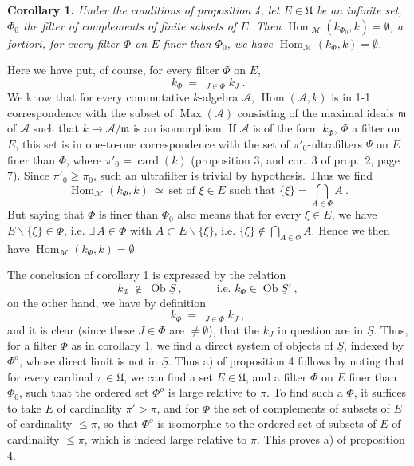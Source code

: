 \documentclass[11pt]{article}
\newcommand{\printedpage}[1]{\marginpar{\footnotesize p.~#1}}
\newcommand{\msp}[1]{\marginpar{\footnotesize [#1]}}
\newcommand{\limind}{\mathop{\underrightarrow{\mathrm{lim}}}}
\begin{document}
\textbf{Corollary 1.} \textit{Under the conditions of proposition 4, let $E\in\mathfrak{U}$ be an infinite set, $\Phi_0$ the filter of complements of finite subsets of $E$. Then $\operatorname{Hom}_{\mathcal{M}}(k_{\Phi_0},k)=\emptyset$, a fortiori, for every filter $\Phi$ on $E$ finer than $\Phi_0$, we have $\operatorname{Hom}_{\mathcal{M}}(k_\Phi,k)=\emptyset$.}

\msp{page 15}
Here we have put, of course, for every filter $\Phi$ on $E$,
\[
k_\Phi\ =\ \limind_{J\in\Phi}k_J\ .
\]
We know that for every commutative $k$-algebra $\mathcal{A}$, $\operatorname{Hom}(\mathcal{A},k)$ is in 1-1 correspondence with the subset of $\operatorname{Max}(\mathcal{A})$ consisting of the maximal ideals $\mathfrak{m}$ of $\mathcal{A}$ such that $k\longrightarrow\mathcal{A}/\mathfrak{m}$ is an isomorphism. If $\mathcal{A}$ is of the form $k_\Phi$, $\Phi$ a filter on $E$, this set is in one-to-one correspondence with the set of $\pi'_0$-ultrafilters $\Psi$ on $E$ finer than $\Phi$, where $\pi'_0=\operatorname{card}(k)$ (proposition 3, and cor.~3 of prop.~2, page 7). Since $\pi'_0\geqslant\pi_0$, such an ultrafilter is trivial by hypothesis. Thus we find
\[
\operatorname{Hom}_{\mathcal{M}}(k_\Phi,k)\ \simeq\ \text{set of } \xi\in E \text{ such that } \{\xi\}=\textstyle\bigcap_{A\in\Phi}A\ . \tag*{$(*)$}
\]
But saying that $\Phi$ is finer than $\Phi_0$ also means that for every $\xi\in E$, we have $E\backslash\{\xi\}\in\Phi$, i.e. $\exists\,A\in\Phi$ with $A\subset E\backslash\{\xi\}$, i.e. $\{\xi\}\notin\bigcap_{A\in\Phi}A$. Hence we then have $\operatorname{Hom}_{\mathcal{M}}(k_\Phi,k)=\emptyset$.

The conclusion of corollary 1 is expressed by the relation
\[
k_\Phi\ \notin\ \operatorname{Ob}\underline{S}\ ,\qquad\quad \text{i.e. } k_\Phi\in\operatorname{Ob}\underline{S}'\ ,
\]
on the other hand, we have by definition
\[
k_\Phi\ =\ \limind_{J\in\Phi}k_J\ ,
\]
\msp{page 16}
and it is clear (since these $J\in\Phi$ are $\neq\emptyset$), that the $k_J$ in question are in $\underline{S}$. Thus, for a filter $\Phi$ as in corollary 1, we find a direct system of objects of $\underline{S}$, indexed by $\Phi^o$, whose direct limit is not in $\underline{S}$. Thus a) of proposition 4 follows by noting that for every cardinal $\pi\in\mathfrak{U}$, we can find a set $E\in\mathfrak{U}$, and a filter $\Phi$ on $E$ finer than $\Phi_0$, such that the ordered set $\Phi^o$ is large relative to $\pi$. To find such a $\Phi$, it suffices to take $E$ of cardinality $\pi'>\pi$, and for $\Phi$ the set
\printedpage{198}
of complements of subsets of $E$ of cardinality $\leqslant\pi$, so that $\Phi^o$ is isomorphic to the ordered set of subsets of $E$ of cardinality $\leqslant\pi$, which is indeed large relative to $\pi$. This proves a) of proposition 4.
\end{document}
